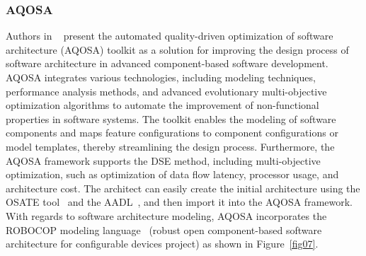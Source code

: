 \subsubsection{AQOSA}
Authors in ~\cite{li2011evolutionary} present the automated quality-driven optimization of software architecture (AQOSA)  toolkit as a solution for improving the design process of software architecture in advanced component-based software development. AQOSA integrates various technologies, including modeling techniques, performance analysis methods, and advanced evolutionary multi-objective optimization algorithms to automate the improvement of non-functional properties in software systems. The toolkit enables the modeling of software components and maps feature configurations to component configurations or model templates, thereby streamlining the design process.
Furthermore, the AQOSA framework supports the DSE method, including multi-objective optimization, such as optimization of data flow latency, processor usage, and architecture cost. The architect can easily create the initial architecture using the OSATE tool~\cite{osate} and the AADL~\cite{feiler2006architecture}, and then import it into the AQOSA framework. With regards to software architecture modeling, AQOSA incorporates the ROBOCOP modeling language~\cite{bondarev2006process} (robust open component-based software architecture for configurable devices project) as shown in Figure~\ref{fig07}.



